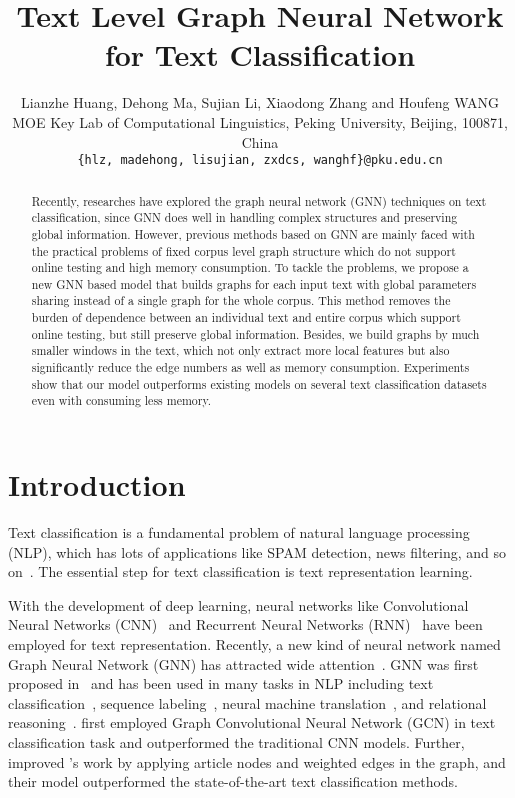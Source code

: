 \documentclass[11pt,a4paper]{article}
\title{Text Level Graph Neural Network for Text Classification}
\author{Lianzhe Huang, Dehong Ma, Sujian Li, Xiaodong Zhang and Houfeng WANG\\
 MOE Key Lab of Computational Linguistics, Peking University, Beijing, 100871, China \\
  {\tt \{hlz, madehong, lisujian, zxdcs, wanghf\}@pku.edu.cn} }
\date{}
\begin{document}
\maketitle
\begin{abstract}
Recently, researches have explored the graph neural network (GNN) techniques on text classification, since GNN does well in handling complex structures and preserving global information. 
However, previous methods based on GNN are mainly faced with the practical problems of fixed corpus level graph structure which do not support online testing and high memory consumption. 
To tackle the problems, we propose a new GNN based model that builds graphs for each input text with global parameters sharing instead of a single graph for the whole corpus. This method removes the burden of dependence between an individual text and entire corpus which support online testing, but still preserve global information. Besides, we build graphs by much smaller windows in the text, which not only extract more local features but also significantly reduce the edge numbers as well as memory consumption. 
Experiments show that our model outperforms existing models on several text classification datasets even with consuming less memory.
  
\end{abstract}

\section{Introduction}
Text classification is a fundamental problem of natural language processing (NLP), which has lots of applications like SPAM detection, news filtering, and so on~\cite{jindal2007review, aggarwal2012survey}. The essential step for text classification is text representation learning. 

With the development of deep learning, neural networks like Convolutional Neural Networks (CNN)~\cite{kim2014convolutional} and Recurrent Neural Networks (RNN)~\cite{hochreiter1997long} have been employed for text representation.
Recently, a new kind of neural network named Graph Neural Network (GNN) has attracted wide attention~\cite{battaglia2018relational}. GNN was first proposed in~\cite{scarselli2009graph} and has been used in many tasks in NLP including text classification~\cite{defferrard2016convolutional}, sequence labeling~\cite{zhang2018sentence}, neural machine translation~\cite{bastings2017graph}, and relational reasoning~\cite{battaglia2016interaction}.  first employed Graph Convolutional Neural Network (GCN) in text classification task and outperformed the traditional CNN models. Further,  improved 's work by applying article nodes and weighted edges in the graph, and their model outperformed the state-of-the-art text classification methods.
\end{document}

